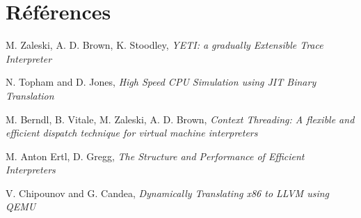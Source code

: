 \documentclass{article} %
\begin{document}
\section{Références}
M. Zaleski, A. D. Brown, K. Stoodley, \textit{YETI: a gradually Extensible Trace Interpreter}

N. Topham and D. Jones, \textit{High Speed CPU Simulation using JIT Binary Translation}

M. Berndl, B. Vitale, M. Zaleski, A. D. Brown, \textit{Context Threading: A flexible and efficient dispatch technique for virtual machine interpreters}

M. Anton Ertl, D. Gregg, \textit{The Structure and Performance of Efficient Interpreters}

V. Chipounov and G. Candea, \textit{Dynamically Translating x86 to LLVM using QEMU}
\end{document}
